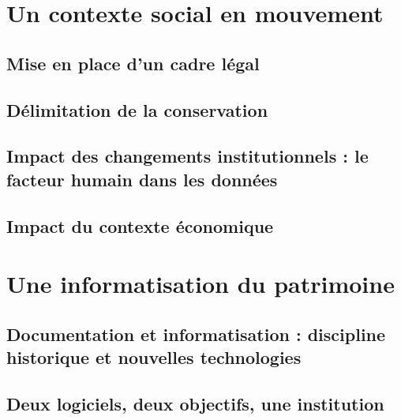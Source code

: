 \documentclass[12pt,twoside, openany]{book} %
\begin{document}


\chapter{Un contexte social en mouvement}

	\section{Mise en place d'un cadre légal}
	
	
	\section{Délimitation de la conservation}
	
	
	 
	\section{Impact des changements institutionnels : le facteur humain dans les données}
	
	
	
	\section{Impact du contexte économique}
	
	
	
\chapter{Une informatisation du patrimoine}

	\section{Documentation et informatisation : discipline historique et nouvelles technologies}
	
	
	
	\section{Deux logiciels, deux objectifs, une institution}
	
\end{document}
